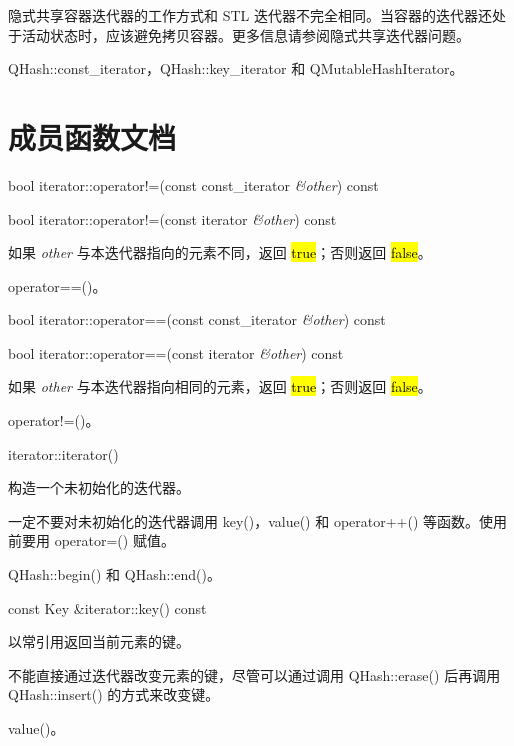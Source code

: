 \begin{warning}
隐式共享容器迭代器的工作方式和 STL 迭代器不完全相同。当容器的迭代器还处于活动状态时，应该避免拷贝容器。更多信息请参阅隐式共享迭代器问题。
\end{warning}
 
\begin{seeAlso}
QHash::const\_iterator，QHash::key\_iterator 和
QMutableHashIterator。
\end{seeAlso}

\section{成员函数文档}

bool iterator::operator!=(const const\_iterator \emph{\&other}) const

bool iterator::operator!=(const iterator \emph{\&other}) const

如果 \emph{other} 与本迭代器指向的元素不同，返回 \hl{true}；否则返回 \hl{false}。

\begin{seeAlso}
operator==()。
\end{seeAlso}
 

bool iterator::operator==(const const\_iterator \emph{\&other}) const

bool iterator::operator==(const iterator \emph{\&other}) const

如果 \emph{other} 与本迭代器指向相同的元素，返回 \hl{true}；否则返回 \hl{false}。



\begin{seeAlso}
operator!=()。
\end{seeAlso}

iterator::iterator()

构造一个未初始化的迭代器。

一定不要对未初始化的迭代器调用 key()，value() 和 operator++() 等函数。使用前要用 operator=() 赋值。


\begin{seeAlso}
 QHash::begin() 和 QHash::end()。
\end{seeAlso}

const Key \&iterator::key() const

以常引用返回当前元素的键。

不能直接通过迭代器改变元素的键，尽管可以通过调用 QHash::erase() 后再调用 QHash::insert() 的方式来改变键。


\begin{seeAlso}
 value()。
\end{seeAlso}

